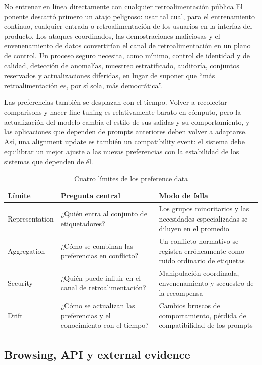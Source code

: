 \begin{importantbox}{No entrenar en línea directamente con cualquier retroalimentación pública}
El ponente descartó primero un atajo peligroso: usar tal cual, para el entrenamiento continuo, cualquier entrada o retroalimentación de los usuarios en la interfaz del producto. Los ataques coordinados, las demostraciones maliciosas y el envenenamiento de datos convertirían el canal de retroalimentación en un plano de control. Un proceso seguro necesita, como mínimo, control de identidad y de calidad, detección de anomalías, muestreo estratificado, auditoría, conjuntos reservados y actualizaciones diferidas, en lugar de suponer que ``más retroalimentación es, por sí sola, más democrática''.
\end{importantbox}

Las preferencias también se desplazan con el tiempo. Volver a recolectar comparisons y hacer fine-tuning es relativamente barato en cómputo, pero la actualización del modelo cambia el estilo de sus salidas y su comportamiento, y las aplicaciones que dependen de prompts anteriores deben volver a adaptarse. Así, una alignment update es también un compatibility event: el sistema debe equilibrar un mejor ajuste a las nuevas preferencias con la estabilidad de los sistemas que dependen de él.

\begin{table}[H]
\centering
\caption{Cuatro límites de los preference data}
\begin{tabularx}{\textwidth}{L{2.5cm} X X}
\toprule
Límite & Pregunta central & Modo de falla \\
\midrule
Representation & ¿Quién entra al conjunto de etiquetadores? & Los grupos minoritarios y las necesidades especializadas se diluyen en el promedio \\
Aggregation & ¿Cómo se combinan las preferencias en conflicto? & Un conflicto normativo se registra erróneamente como ruido ordinario de etiquetas \\
Security & ¿Quién puede influir en el canal de retroalimentación? & Manipulación coordinada, envenenamiento y secuestro de la recompensa \\
Drift & ¿Cómo se actualizan las preferencias y el conocimiento con el tiempo? & Cambios bruscos de comportamiento, pérdida de compatibilidad de los prompts \\
\bottomrule
\end{tabularx}
\end{table}

\subsection{Browsing, API y external evidence}

